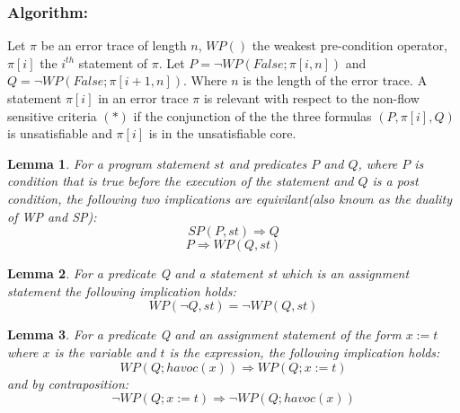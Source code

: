 \documentclass{article}
\newtheorem{lemma}{Lemma}
\begin{document}
\subsubsection* {Algorithm:}
Let $\pi$ be an error trace of length $n$, $WP()$ the weakest pre-condition operator, $\pi[i]$ the $i^{th}$ statement of $\pi$. Let $P=\neg WP(False; \pi[i,n])$ and $Q=\neg WP(False; \pi[i+1,n])$. Where $n$ is the length of the error trace. A statement $\pi[i]$ in an error trace $\pi$ is relevant with respect to the non-flow sensitive criteria $(*)$ if the conjunction of the the three formulas $(P,\pi[i],Q) $ is unsatisfiable and $\pi[i]$ is in the unsatisfiable core.\\
\begin{lemma}
For a program statement $st$ and predicates $P$ and $Q$, where $P$ is condition that is true before the execution of the statement and $Q$ is a post condition, the following two implications are equivilant(also known as the duality of WP and SP):
$$SP(P,st) \Rightarrow Q$$
$$P \Rightarrow WP(Q,st)$$
\end{lemma}

\begin{lemma}
For a predicate Q and a statement st which is an assignment statement the following implication holds:\\
$$WP(\neg Q,st) = \neg WP(Q,st)$$
\end{lemma}

\begin{lemma}
For a predicate Q and an assignment statement of the form $x:=t$ where $x$ is the variable and $t$ is the expression, the following implication holds:
$$WP(Q;havoc(x)) \Rightarrow WP(Q;x:=t)$$
and by contraposition:
$$\neg WP(Q;x:=t) \Rightarrow \neg WP(Q;havoc(x))$$
\end{lemma}
\end{document}
